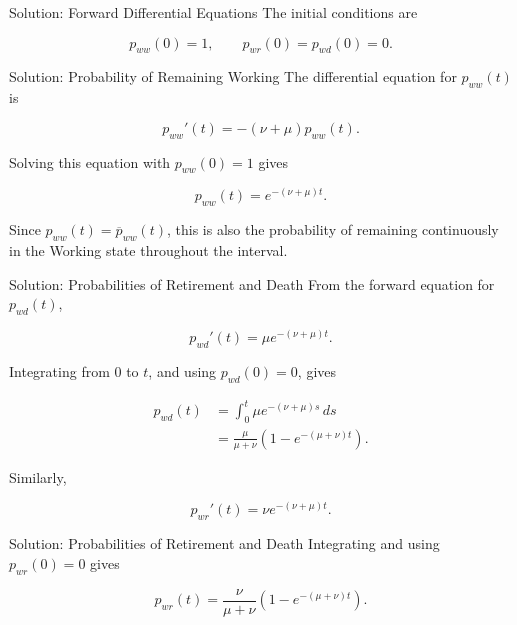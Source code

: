 \documentclass[
  ignorenonframetext,
  aspectratio=169,
]{beamer}
\begin{document}
\begin{frame}{Solution: Forward Differential Equations}
\protect{}\label{solution-forward-differential-equations-1}
The initial conditions are

\[
p_{ww}(0)=1,
\qquad
p_{wr}(0)=p_{wd}(0)=0.
\]
\end{frame}

\begin{frame}{Solution: Probability of Remaining Working}
\protect{}\label{solution-probability-of-remaining-working}
The differential equation for \(p_{ww}(t)\) is

\[
p_{ww}'(t)=-(\nu+\mu)p_{ww}(t).
\]

Solving this equation with \(p_{ww}(0)=1\) gives

\[
\boxed{
p_{ww}(t)=e^{-(\nu+\mu)t}.
}
\]

Since \(p_{ww}(t)=\overline p_{ww}(t)\), this is also the probability of
remaining continuously in the Working state throughout the interval.
\end{frame}

\begin{frame}{Solution: Probabilities of Retirement and Death}
\protect{}\label{solution-probabilities-of-retirement-and-death}
From the forward equation for \(p_{wd}(t)\),

\[
p_{wd}'(t)=\mu e^{-(\nu+\mu)t}.
\]

Integrating from \(0\) to \(t\), and using \(p_{wd}(0)=0\), gives

\[
\begin{aligned}
p_{wd}(t)
&=\int_0^t\mu e^{-(\nu+\mu)s}\,ds\\
&=\boxed{
\frac{\mu}{\mu+\nu}
\left(1-e^{-(\mu+\nu)t}\right).
}
\end{aligned}
\]

Similarly,

\[
p_{wr}'(t)=\nu e^{-(\nu+\mu)t}.
\]
\end{frame}

\begin{frame}{Solution: Probabilities of Retirement and Death}
\protect{}\label{solution-probabilities-of-retirement-and-death-1}
Integrating and using \(p_{wr}(0)=0\) gives

\[
\boxed{
p_{wr}(t)
=
\frac{\nu}{\mu+\nu}
\left(1-e^{-(\mu+\nu)t}\right).
}
\]
\end{frame}
\end{document}
